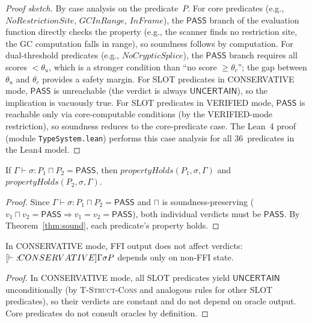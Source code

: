 \documentclass[acmsmall,review,anonymous]{acmart}
\newcommand{\PASS}{\ensuremath{\mathsf{PASS}}\xspace}
\newcommand{\UNCERTAIN}{\ensuremath{\mathsf{UNCERTAIN}}\xspace}
\newcommand{\seq}{\sigma}
\newcommand{\pred}{P}
\newcommand{\judg}[3]{#1 \vdash #2 : #3}
\begin{document}
\begin{proof}[Proof sketch]
By case analysis on the predicate~$\pred$.
For core predicates (e.g., $\mathit{NoRestrictionSite}$,
$\mathit{GCInRange}$, $\mathit{InFrame}$), the \PASS{} branch of
the evaluation function directly checks the property (e.g., the
scanner finds no restriction site, the GC computation falls in range),
so soundness follows by computation.
For dual-threshold predicates (e.g., $\mathit{NoCrypticSplice}$),
the \PASS{} branch requires all scores $< \theta_u$, which is a
stronger condition than ``no score $\ge \theta_c$''; the gap between
$\theta_u$ and $\theta_c$ provides a safety margin.
For SLOT predicates in CONSERVATIVE mode, \PASS{} is unreachable
(the verdict is always \UNCERTAIN{}), so the implication is vacuously
true.
For SLOT predicates in VERIFIED mode, \PASS{} is reachable only via
core-computable conditions (by the VERIFIED-mode restriction), so
soundness reduces to the core-predicate case.
The Lean~4 proof (module \texttt{TypeSystem.lean}) performs this case
analysis for all 36~predicates in the Lean4 model.
\end{proof}

\begin{corollary}\label{cor:comp}
If\/ $\judg{\Gamma}{\seq}{\pred_1 \sqcap \pred_2} = \PASS$, then
$\mathit{propertyHolds}(\pred_1, \seq, \Gamma)$ and
$\mathit{propertyHolds}(\pred_2, \seq, \Gamma)$.
\end{corollary}

\begin{proof}
Since $\judg{\Gamma}{\seq}{\pred_1 \sqcap \pred_2} = \PASS$ and
$\sqcap$ is soundness-preserving ($v_1 \sqcap v_2 = \PASS \Rightarrow
v_1 = v_2 = \PASS$), both individual verdicts must be \PASS.
By Theorem~\ref{thm:sound}, each predicate's property holds.
\end{proof}

\begin{corollary}\label{cor:slot}
In CONSERVATIVE mode, FFI output does not affect verdicts:
$\judg[\textit{CONSERVATIVE}]{\Gamma}{\seq}{\pred}$ depends only on
non-FFI state.
\end{corollary}

\begin{proof}
In CONSERVATIVE mode, all SLOT predicates yield \UNCERTAIN{}
unconditionally (by \textsc{T-Struct-Cons} and analogous rules for
other SLOT predicates), so their verdicts are constant and do not
depend on oracle output.
Core predicates do not consult oracles by definition.
\end{proof}
\end{document}
